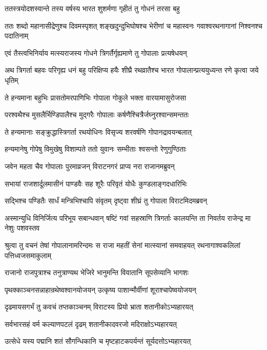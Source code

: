 \twolineshloka
{ततस्त्रयोदशस्वान्ते तस्य वर्षस्य भारत}
{शुशर्मणा गृहीतं तु गोधनं तरसा बहु}


\threelineshloka
{ततः शब्दो महानासीद्रेणुश्च दिवमस्पृशत्}
{शङ्खदुन्दुभिघोषश्च भेरीणां च महास्वनः}
{गवाश्वरथनागानां निश्वनश्च पदातिनाम्}


\twolineshloka
{एवं तैस्त्वभिनिर्याय मत्स्यराजस्य गोधने}
{त्रिगर्तैर्गृह्यमाणे तु गोपालाः प्रत्यषेधयन्}


\threelineshloka
{अथ त्रिगर्ता बहवः परिगृह्य धनं बहु}
{परिक्षिप्य हयैः शीघ्रै रथव्रातैश्च भारत}
{गोपालान्प्रत्ययुध्यन्त रणे कृत्वा जये धृतिम्}


\twolineshloka
{ते हन्यमाना बहुभिः प्रासतोमरपाणिभिः}
{गोपाला गोकुले भक्ता वारयामासुरोजसा}


\twolineshloka
{परश्वथैश्च मुसलैर्भिण्डिपालैश्च मुद्गरैः}
{गोपालाः कर्षणैश्चित्रैर्जघ्नुरश्वान्समन्ततः}


\twolineshloka
{ते हन्यमानाः सङ्क्रुद्धास्त्रिगर्ता रथयोधिनः}
{विसृज्य शरवर्षणि गोपानद्रावयन्बलात्}


\twolineshloka
{हन्यमानेषु गोपेषु विमुखेषु विशाम्पते}
{ततो युवानः सम्भीताः श्वसन्तो रेणुगुण्ठिताः}


\twolineshloka
{जवेन महता चैव गोपालाः पुरमाव्रजन्}
{विराटनगरं प्राप्य नरा राजानमब्रुवन्}


\twolineshloka
{सभायां राजशार्दूलमासीनं पाण्डवैः सह}
{शूरैः परिवृतं योधैः कुण्डलाङ्गदधारिभिः}


\twolineshloka
{सद्भिश्च पण्डितैः सार्धं मन्त्रिभिश्चापि संवृतम्}
{दृष्ट्वा शीघ्रं तु गोपाला विराटमिदमब्रवन्}


\threelineshloka
{अस्मान्युधि विनिर्जित्य परिभूय सबान्धवान्}
{षष्टिं गवां सहस्राणि त्रिगर्ताः कालयन्ति}
{ता निवर्तय राजेन्द्र मा नेशुः पशवस्तव}



\threelineshloka
{श्रुत्वा तु वचनं तेषां गोपालानामरिन्दमः}
{स राजा महतीं सेनां मात्स्यानां समवाहयत्}
{रथनागाश्वकलिलां पत्तिध्वजसमाकुलाम्}


\twolineshloka
{राजानो राजपुत्राश्च तनुत्राण्यथ भेजिरे}
{भानुमन्ति विवातानि सूपसेव्यानि भागशः}


\twolineshloka
{पृथक्काञ्चनसन्नाहान्रथेष्वश्वानयोजयन्}
{उत्कृष्य पाशान्मौर्वीणां शूराश्चापेष्वयोजयन्}


\twolineshloka
{दृढमायसगर्भं तु कवचं तप्तकाञ्चनम्}
{विराटस्य प्रियो भ्राता शतानीकोऽभ्यहारयत्}


\twolineshloka
{सर्वभारसहं वर्म कल्याणपटलं दृढम्}
{शतानीकादवरजो मदिराक्षोऽभ्यहारयत्}


\twolineshloka
{उत्सेधे यस्य पद्मानि शतं सौगन्धिकानि च}
{मृष्टहाटकपर्यन्तं सूर्यदत्तोऽभ्यहारयत्}



